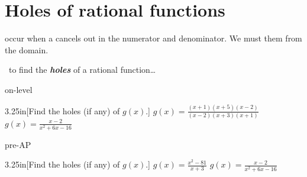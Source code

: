 \section{Holes of rational functions}

  occur when a  cancels out 
in the numerator and denominator.
We must  them from the domain.

\begin{myConceptSteps}{~to find the {\bfseries\itshape holes} of a rational function\dots}
\end{myConceptSteps}


\begin{taggedblock}{on-level}
    \begin{my2Problems}{3.25in}[Find the holes (if any) of $g(x)$.]
        {
            $g(x) = \frac{(x+1)(x+5)(x-2)}{(x-2)(x+3)(x+1)}$
        }
        {
            $g(x) = \frac{x-2}{x^2 + 6x -16}$
        }
    \end{my2Problems}
\end{taggedblock}
\begin{taggedblock}{pre-AP}
    \begin{my2Problems}{3.25in}[Find the holes (if any) of $g(x)$.]
        {
            $g(x) = \frac{x^2 - 81}{x+3}$
        }
        {
            $g(x) = \frac{x-2}{x^2 + 6x -16}$
        }
    \end{my2Problems}
\end{taggedblock}


